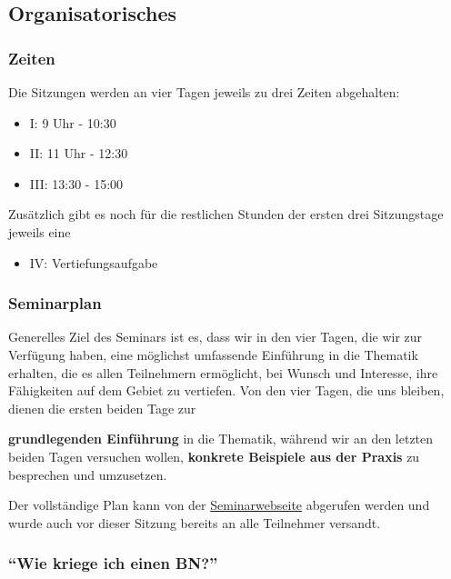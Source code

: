 
\subsection{\texorpdfstring{{Organisatorisches}}{Organisatorisches}}

\subsubsection{\texorpdfstring{{Zeiten}}{Zeiten}}

Die Sitzungen werden an vier Tagen jeweils zu drei Zeiten abgehalten:

\begin{itemize}
\itemsep1pt\parskip0pt
\item
  I: 9 Uhr - 10:30
\item
  II: 11 Uhr - 12:30
\item
  III: 13:30 - 15:00
\end{itemize}

Zusätzlich gibt es noch für die restlichen Stunden der ersten drei
Sitzungstage jeweils eine

\begin{itemize}
\itemsep1pt\parskip0pt
\item
  IV: Vertiefungsaufgabe
\end{itemize}

\subsubsection{\texorpdfstring{{Seminarplan}}{Seminarplan}}

Generelles Ziel des Seminars ist es, dass wir in den vier Tagen, die wir
zur Verfügung haben, eine möglichst umfassende Einführung in die
Thematik erhalten, die es allen Teilnehmern ermöglicht, bei Wunsch und
Interesse, ihre Fähigkeiten auf dem Gebiet zu vertiefen. Von den vier
Tagen, die uns bleiben, dienen die ersten beiden Tage zur
\par\noindent\textbf{grundlegenden Einführung} in die Thematik, während wir an den
letzten beiden Tagen versuchen wollen, \textbf{konkrete Beispiele aus
der Praxis} zu besprechen und umzusetzen.

Der vollständige Plan kann von der
\href{http://lingulist.de/pyjs/seminarplan.html}{Seminarwebseite}
abgerufen werden und wurde auch vor dieser Sitzung bereits an alle
Teilnehmer versandt.

\subsubsection{\texorpdfstring{{``Wie kriege ich einen
BN?''}}{Wie kriege ich einen BN?}}

